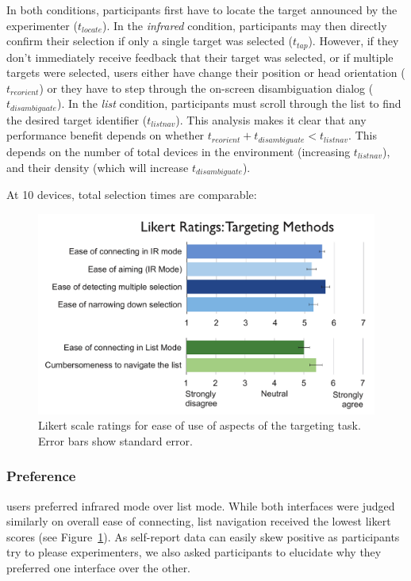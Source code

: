 In both conditions, participants first have to locate the target announced by the experimenter ($t_{locate}$). In the {\em infrared} condition, participants may then directly confirm their selection if only a single target was selected ($t_{tap}$). However, if they don't immediately receive feedback that their target was selected, or if multiple targets were selected, users either have change their position or head orientation ($t_{reorient}$) or they have to step through the on-screen disambiguation dialog ($t_{disambiguate}$). In the {\em list} condition, participants must scroll through the list to find the desired target identifier ($t_{listnav}$).
This analysis makes it clear that any performance benefit depends on whether $t_{reorient}+t_{disambiguate}<t_{listnav}$. This depends on the number of total devices in the environment (increasing $t_{listnav}$), and their density (which will increase $t_{disambiguate}$). 

At 10 devices, total selection times are comparable:


\begin{figure}[t]
\centering
\includegraphics[width=1.0\columnwidth]{figures/target-likert.pdf}
\caption{Likert scale ratings for ease of use of aspects of the targeting task. Error bars show standard error. }
\label{fig:target-likert}
\end{figure}

\subsubsection{Preference}
 users preferred infrared mode over list mode. While both interfaces were judged similarly on overall ease of connecting, list navigation received the lowest likert scores (see Figure~\ref{fig:target-likert}). As self-report data can easily skew positive as participants try to please experimenters, we also asked participants to elucidate why they preferred one interface over the other.

